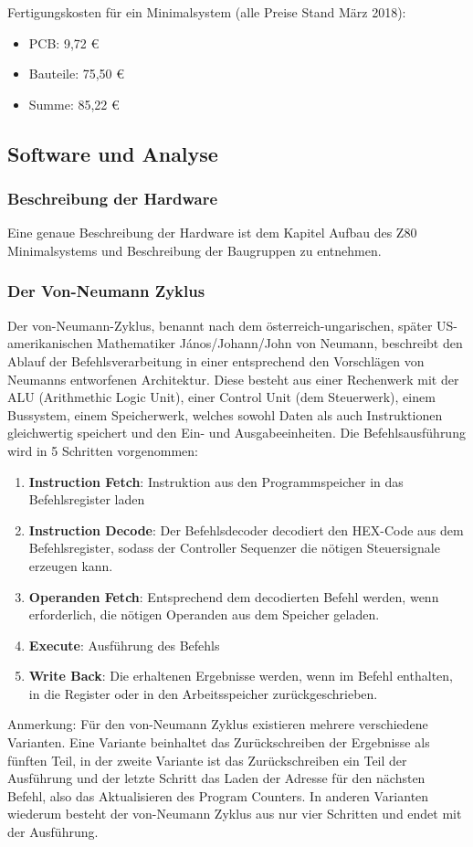Fertigungskosten für ein Minimalsystem (alle Preise Stand März 2018):
\begin{itemize}
    \item PCB: 9,72 €
    \item Bauteile: 75,50 €
    \item Summe: 85,22 €
\end{itemize}

\subsection{Software und Analyse}
\label{sec:z80-software}
\subsubsection{Beschreibung der Hardware}
Eine genaue Beschreibung der Hardware ist dem Kapitel Aufbau des Z80 Minimalsystems und Beschreibung der Baugruppen zu entnehmen.

\subsubsection{Der Von-Neumann Zyklus}
Der von-Neumann-Zyklus, benannt nach dem österreich-ungarischen, später US-amerikanischen Mathematiker János/Johann/John von Neumann, beschreibt den Ablauf der Befehlsverarbeitung in einer entsprechend den Vorschlägen von Neumanns entworfenen Architektur. Diese besteht aus einer Rechenwerk mit der ALU (Arithmethic Logic Unit), einer Control Unit (dem Steuerwerk), einem Bussystem, einem Speicherwerk, welches sowohl Daten als auch Instruktionen gleichwertig speichert und den Ein- und Ausgabeeinheiten. Die Befehlsausführung wird in 5 Schritten vorgenommen:

\begin{enumerate}
    \item \textbf{Instruction Fetch}: Instruktion aus den Programmspeicher in das Befehlsregister laden
    \item \textbf{Instruction Decode}: Der Befehlsdecoder decodiert den HEX-Code aus dem Befehlsregister, sodass der Controller Sequenzer die nötigen Steuersignale erzeugen kann.
    \item \textbf{Operanden Fetch}: Entsprechend dem decodierten Befehl werden, wenn erforderlich, die nötigen Operanden aus dem Speicher geladen.
    \item \textbf{Execute}: Ausführung des Befehls
    \item \textbf{Write Back}: Die erhaltenen Ergebnisse werden, wenn im Befehl enthalten, in die Register oder in den Arbeitsspeicher zurückgeschrieben.
\end{enumerate}
\begin{warning}
    Anmerkung: Für den von-Neumann Zyklus existieren mehrere verschiedene Varianten. Eine Variante beinhaltet das Zurückschreiben der Ergebnisse als fünften Teil, in der zweite Variante ist das Zurückschreiben ein Teil der Ausführung und der letzte Schritt das Laden der Adresse für den nächsten Befehl, also das Aktualisieren des Program Counters. In anderen Varianten wiederum besteht der von-Neumann Zyklus aus nur vier Schritten und endet mit der Ausführung.
\end{warning}

